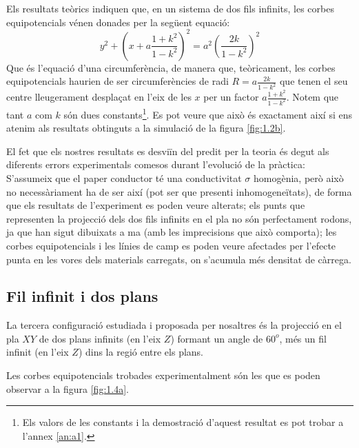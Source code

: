 \documentclass[a4paper,10.5pt]{report}
\begin{document}
Els resultats teòrics indiquen que, en un sistema de dos fils infinits, les corbes equipotencials vénen donades per la següent equació:
\begin{equation}
	y^2+\left( x+a\frac{1+k^2}{1-k^2}\right)^2 = a^2\left( \frac{2k}{1-k^2}\right)^2  \label{eqsuppon}
\end{equation}
Que és l'equació d'una circumferència, de manera que, teòricament, les corbes equipotencials haurien de ser circumferències de radi $R = a\frac{2k}{1-k^2}$ que tenen el seu centre lleugerament desplaçat en l'eix de les $x$ per un factor $a\frac{1+k^2}{1-k^2}$. Notem que tant $a$ com $k$ són dues constants\footnote{Els valors de les constants i la demostració d'aquest resultat es pot trobar a l'annex \ref{an:a1}.}. Es pot veure que això és exactament així si ens atenim als resultats obtinguts a la simulació de la figura \ref{fig:1.2b}.

El fet que els nostres resultats es desviïn del predit per la teoria és degut als diferents errors experimentals comesos durant l'evolució de la pràctica: S'assumeix que el paper conductor té una conductivitat $\sigma$ homogènia, però això no necessàriament ha de ser així (pot ser que presenti inhomogeneïtats), de forma que els resultats de l'experiment es poden veure alterats; els punts que representen la projecció dels dos fils infinits en el pla no són perfectament rodons, ja que han sigut dibuixats a ma (amb les imprecisions que això comporta); les corbes equipotencials i les línies de camp es poden veure afectades per l'efecte punta en les vores dels materials carregats, on s'acumula més densitat de càrrega. 


\subsection{Fil infinit i dos plans}

La tercera configuració estudiada i proposada per nosaltres és la projecció en el pla $XY$ de dos plans infinits (en l'eix $Z$) formant un angle de $60^o$, més un fil infinit (en l'eix $Z$) dins la regió entre els plans.

Les corbes equipotencials trobades experimentalment són les que es poden observar a la figura \ref{fig:1.4a}.
\end{document}
